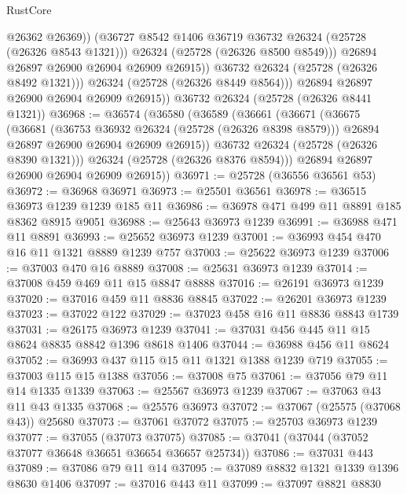 \begin{lexlean}{RustCore}
\begin{coremodule}
                      @26362
                      @26369))
                  (@36727 @8542 @1406 @36719 @36732 @26324 (@25728 (@26326 @8543 @1321)))
                  @26324
                  (@25728 (@26326 @8500 @8549)))
                @26894
                @26897
                @26900
                @26904
                @26909
                @26915))
            @36732
            @26324
            (@25728 (@26326 @8492 @1321)))
          @26324
          (@25728 (@26326 @8449 @8564)))
        @26894
        @26897
        @26900
        @26904
        @26909
        @26915))
    @36732
    @26324
    (@25728 (@26326 @8441 @1321))
@36968 := @36574
    (@36580
      (@36589
        (@36661
          (@36671
            (@36675
              (@36681
                (@36753 @36932 @26324 (@25728 (@26326 @8398 @8579)))
                @26894
                @26897
                @26900
                @26904
                @26909
                @26915))
            @36732
            @26324
            (@25728 (@26326 @8390 @1321)))
          @26324
          (@25728 (@26326 @8376 @8594)))
        @26894
        @26897
        @26900
        @26904
        @26909
        @26915))
@36971 := @25728 (@36556 @36561 @53)
@36972 := @36968 @36971
@36973 := @25501 @36561
@36978 := @36515 @36973 @1239 @1239 @185 @11
@36986 := @36978 @471 @499 @11 @8891 @185 @8362 @8915 @9051
@36988 := @25643 @36973 @1239
@36991 := @36988 @471 @11 @8891
@36993 := @25652 @36973 @1239
@37001 := @36993 @454 @470 @16 @11 @1321 @8889 @1239 @757
@37003 := @25622 @36973 @1239
@37006 := @37003 @470 @16 @8889
@37008 := @25631 @36973 @1239
@37014 := @37008 @459 @469 @11 @15 @8847 @8888
@37016 := @26191 @36973 @1239
@37020 := @37016 @459 @11 @8836 @8845
@37022 := @26201 @36973 @1239
@37023 := @37022 @122
@37029 := @37023 @458 @16 @11 @8836 @8843 @1739
@37031 := @26175 @36973 @1239
@37041 := @37031 @456 @445 @11 @15 @8624 @8835 @8842 @1396 @8618 @1406
@37044 := @36988 @456 @11 @8624
@37052 := @36993 @437 @115 @15 @11 @1321 @1388 @1239 @719
@37055 := @37003 @115 @15 @1388
@37056 := @37008 @75
@37061 := @37056 @79 @11 @14 @1335 @1339
@37063 := @25567 @36973 @1239
@37067 := @37063 @43 @11 @43 @1335
@37068 := @25576 @36973
@37072 := @37067 (@25575 (@37068 @43)) @25680
@37073 := @37061 @37072
@37075 := @25703 @36973 @1239
@37077 := @37055 (@37073 @37075)
@37085 := @37041 (@37044 (@37052 @37077 @36648 @36651 @36654 @36657 @25734))
@37086 := @37031 @443
@37089 := @37086 @79 @11 @14
@37095 := @37089 @8832 @1321 @1339 @1396 @8630 @1406
@37097 := @37016 @443 @11
@37099 := @37097 @8821 @8830

\end{coremodule}
\end{lexlean}
